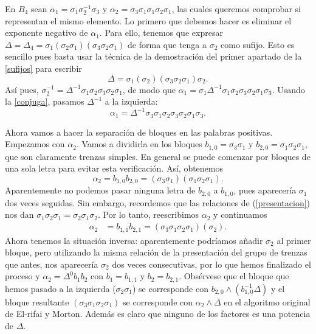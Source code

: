 \documentclass[bibtex, anon]{TEMat-article}
\begin{document}
\begin{ejemplo}\label{ejnormal}
	En $B_4$ sean $\alpha_1=\sigma_1\sigma_2^{-1}\sigma_3$ y $\alpha_2=\sigma_3\sigma_1\sigma_1\sigma_2\sigma_1$, las cuales queremos comprobar si representan el mismo elemento. Lo primero que debemos hacer es eliminar el exponente negativo de $\alpha_1$. Para ello, tenemos que expresar $\Delta=\Delta_4=\sigma_1(\sigma_2\sigma_1)(\sigma_3\sigma_2\sigma_1)$ de forma que tenga a $\sigma_2$ como sufijo. Esto es sencillo pues basta usar la técnica de la demostración del primer apartado de la \cref{sufijos} para escribir
	\[
	\Delta=\sigma_1(\sigma_2)(\sigma_3\sigma_2\sigma_1)\sigma_2.
	\]
	Así pues, $\sigma_2^{-1}=\Delta^{-1}\sigma_1\sigma_2\sigma_3\sigma_2\sigma_1$, de modo que $\alpha_1=\sigma_1\Delta^{-1}\sigma_1\sigma_2\sigma_3\sigma_2\sigma_1\sigma_3$. Usando la \cref{conjuga}, pasamos $\Delta^{-1}$ a la izquierda:
	\[
	\alpha_1=\Delta^{-1}\sigma_3\sigma_1\sigma_2\sigma_3\sigma_2\sigma_1\sigma_3.
	\]
	
	Ahora vamos a hacer la separación de bloques en las palabras positivas. Empezamos con $\alpha_2$. Vamos a dividirla en los bloques $b_{1,0}=\sigma_3\sigma_1$ y $b_{2,0}=\sigma_1\sigma_2\sigma_1$, que son claramente trenzas simples. En general se puede comenzar por bloques de una sola letra para evitar esta verificación. Así, obtenemos
	\[
	\alpha_2=b_{1,0}b_{2,0}=(\sigma_3\sigma_1)(\sigma_1\sigma_2\sigma_1).
	\]
	Aparentemente no podemos pasar ninguna letra de $b_{2,0}$ a $b_{1,0}$, pues aparecería $\sigma_1$ dos veces seguidas. Sin embargo, recordemos que las relaciones de (\ref{presentacion}) nos dan $\sigma_1\sigma_2\sigma_1=\sigma_2\sigma_1\sigma_2$. Por lo tanto, reescribimos $\alpha_2$ y continuamos
	\begin{align*}
	\alpha_2&=b_{1,1}b_{2,1}=(\sigma_3\sigma_1\sigma_2\sigma_1)(\sigma_2).
	\end{align*}
	Ahora tenemos la situación inversa: aparentemente podríamos añadir $\sigma_2$ al primer bloque, pero utilizando la misma relación de la presentación del grupo de trenzas que antes, nos aparecería $\sigma_2$ dos veces consecutivas, por lo que hemos finalizado el proceso y $\alpha_2=\Delta^0b_1b_2$ con $b_1=b_{1,1}$ y $b_2=b_{2,1}$. Obsérvese que el bloque que hemos pasado a la izquierda ($\sigma_2\sigma_1$) se corresponde con $b_{2,0}\land (b_{1,0}^{-1}\Delta)$ y el bloque resultante $(\sigma_3\sigma_1\sigma_2\sigma_1)$ se corresponde con $\alpha_2\land\Delta$ en el algoritmo original de El-rifai y Morton. Además es claro que ninguno de los factores es una potencia de $\Delta$.
	\end{ejemplo}

\nocite{*}
\printbibliography[heading=bibintoc]
\end{document}
